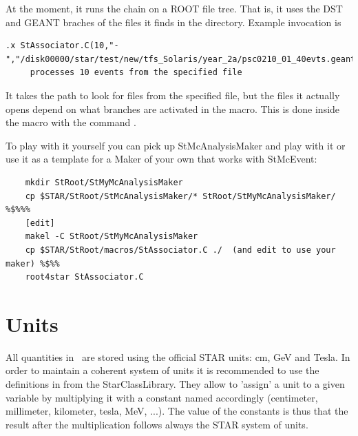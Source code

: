 
At the moment, it runs the chain on a ROOT file tree.  That is, it uses the DST
and GEANT braches of the files it finds in the directory.  Example invocation
is 
\begin{verbatim}
.x StAssociator.C(10,"-","/disk00000/star/test/new/tfs_Solaris/year_2a/psc0210_01_40evts.geant.root")
     processes 10 events from the specified file

\end{verbatim}
It takes the path to look for files from the specified file, but the files it actually opens depend on
what branches are activated in the macro.  This is done inside the macro with the command .

To play with it yourself you can pick up StMcAnalysisMaker and play with it
or use it as a template for a Maker of your own that works with
StMcEvent:

\begin{verbatim}
    mkdir StRoot/StMyMcAnalysisMaker
    cp $STAR/StRoot/StMcAnalysisMaker/* StRoot/StMyMcAnalysisMaker/ %$%%%
    [edit]
    makel -C StRoot/StMyMcAnalysisMaker
    cp $STAR/StRoot/macros/StAssociator.C ./  (and edit to use your maker) %$%%
    root4star StAssociator.C
\end{verbatim}


\section{Units}
 
\label{sec:units}

All quantities in \StMcEvent\ are stored using the official STAR units:
cm, GeV and Tesla.  In order to maintain a coherent system of units it
is recommended to use the definitions in  from
the StarClassLibrary. They allow to 'assign' a unit to a given
variable by multiplying it with a constant named accordingly
(centimeter, millimeter, kilometer, tesla, MeV, ...).  The value of
the constants is thus that the result after the multiplication follows
always the STAR system of units.

